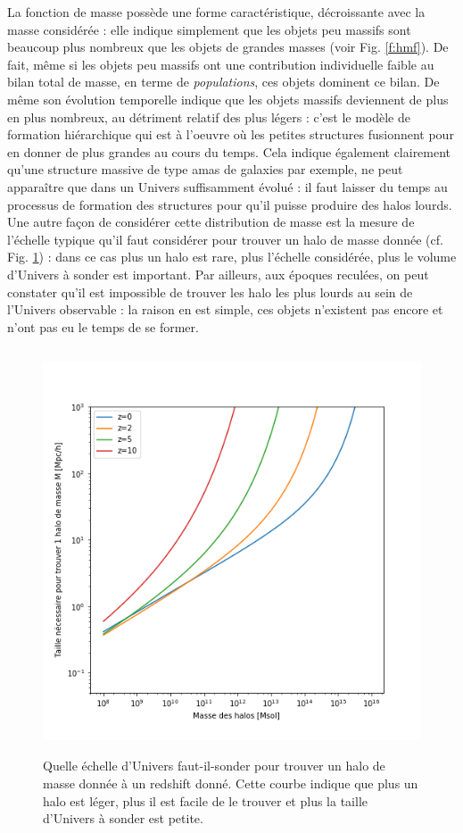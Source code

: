 La fonction de masse possède une forme caractéristique, décroissante avec la masse considérée : elle indique simplement que les objets peu massifs sont beaucoup plus nombreux que les objets de grandes masses (voir Fig. \ref{f:hmf}). De fait, même si les objets peu massifs ont une contribution individuelle faible au bilan total de masse, en terme de \textit{populations}, ces objets dominent ce bilan. De même son évolution temporelle indique que les objets massifs deviennent de plus en plus nombreux, au détriment relatif des plus légers : c'est le modèle de formation hiérarchique qui est à l'oeuvre où les petites structures fusionnent pour en donner de plus grandes au cours du temps. Cela indique également clairement qu'une structure massive de type amas de galaxies par exemple, ne peut apparaître que dans un Univers suffisamment évolué : il faut laisser du temps au processus de formation des structures pour qu'il puisse produire des halos lourds. Une autre façon de considérer cette distribution de masse est la mesure de l'échelle typique qu'il faut considérer pour trouver un halo de masse donnée (cf. Fig. \ref{f:L}) : dans ce cas plus un halo est rare, plus l'échelle considérée, plus le volume d'Univers à sonder est important. Par ailleurs, aux époques reculées, on peut constater qu'il est impossible de trouver les halo les plus lourds au sein de l'Univers observable : la raison en est simple, ces objets n'existent pas encore et n'ont pas eu le temps de se former.

\begin{figure}[htbp]
	\centering
		\includegraphics[height=12cm]{figs/L.png}
	\caption[Quelle échelle d'Univers faut-il-sonder pour trouver un halo de masse donnée à une époque donnée]{Quelle échelle d'Univers faut-il-sonder pour trouver un halo de masse donnée à un redshift donné. Cette courbe indique que plus un halo est léger, plus il est facile de le trouver et plus la taille d'Univers à sonder est petite.} 
	\label{f:L}
\end{figure}

